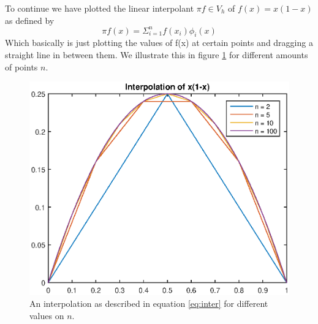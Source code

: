 \documentclass[11pt]{article}
\begin{document}
To continue we have plotted the linear interpolant $\pi  f \in V_h$ of $f(x) = x(1-x)$ as defined by
\begin{equation}
	 \pi f(x) = \Sigma^n_{i=1} f(x_i) \phi_i(x)
	 \label{eq:inter}
\end{equation}
Which basically is just plotting the values of f(x) at certain points and dragging a straight line in between them. We illustrate this in figure \ref{fig:inter} for different amounts of points $n$. 
\begin{figure}[H]
	\centering
	\includegraphics[width=1\textwidth]{../ex1/inter}
	\caption{An interpolation as described in equation \ref{eq:inter} for different values on $n$.}
	\label{fig:inter}
\end{figure}
\end{document}

